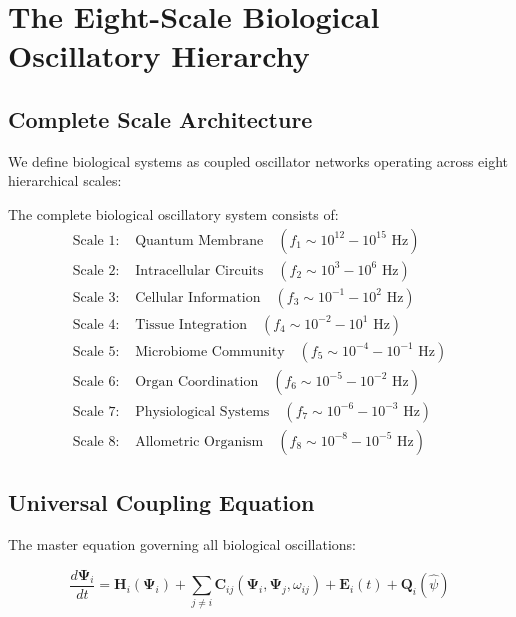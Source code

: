 \documentclass[twocolumn]{article}
\begin{document}
\section{The Eight-Scale Biological Oscillatory Hierarchy}

\subsection{Complete Scale Architecture}

We define biological systems as coupled oscillator networks operating across eight hierarchical scales:

\begin{definition}
The complete biological oscillatory system consists of:
\begin{align}
\text{Scale 1: } &\text{Quantum Membrane} \quad (f_1 \sim 10^{12}-10^{15} \text{ Hz}) \label{eq:quantum_membrane} \\
\text{Scale 2: } &\text{Intracellular Circuits} \quad (f_2 \sim 10^3-10^6 \text{ Hz}) \label{eq:intracellular} \\
\text{Scale 3: } &\text{Cellular Information} \quad (f_3 \sim 10^{-1}-10^2 \text{ Hz}) \label{eq:cellular} \\
\text{Scale 4: } &\text{Tissue Integration} \quad (f_4 \sim 10^{-2}-10^1 \text{ Hz}) \label{eq:tissue} \\
\text{Scale 5: } &\text{Microbiome Community} \quad (f_5 \sim 10^{-4}-10^{-1} \text{ Hz}) \label{eq:microbiome} \\
\text{Scale 6: } &\text{Organ Coordination} \quad (f_6 \sim 10^{-5}-10^{-2} \text{ Hz}) \label{eq:organ} \\
\text{Scale 7: } &\text{Physiological Systems} \quad (f_7 \sim 10^{-6}-10^{-3} \text{ Hz}) \label{eq:physiological} \\
\text{Scale 8: } &\text{Allometric Organism} \quad (f_8 \sim 10^{-8}-10^{-5} \text{ Hz}) \label{eq:allometric}
\end{align}
\end{definition}

\subsection{Universal Coupling Equation}

The master equation governing all biological oscillations:

\begin{equation}
\frac{d\mathbf{\Psi}_i}{dt} = \mathbf{H}_i(\mathbf{\Psi}_i) + \sum_{j \neq i} \mathbf{C}_{ij}(\mathbf{\Psi}_i, \mathbf{\Psi}_j, \omega_{ij}) + \mathbf{E}_i(t) + \mathbf{Q}_i(\hat{\psi})
\label{eq:master_oscillation}
\end{equation}
\end{document}
